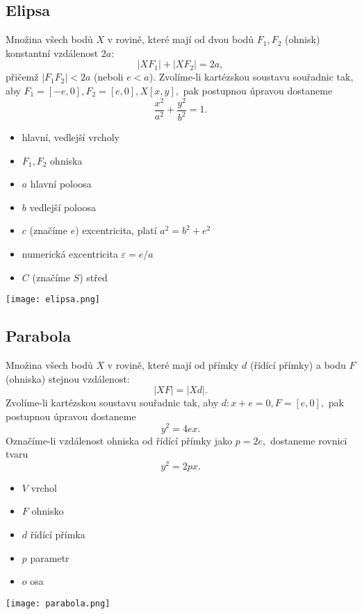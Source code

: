 \subsection{Elipsa}
Množina všech bodů $X$ v rovině, které mají od dvou bodů $F_1, F_2$
(ohnisk) konstantní vzdálenost $2a$:
$$|XF_1| + |XF_2|=2a,$$
přičemž $|F_1F_2|<2a$ (neboli $e<a$).
Zvolíme-li kartézskou soustavu souřadnic tak, aby $F_1 = [-e,0], F_2=[e,0],
X[x,y],$ pak postupnou úpravou dostaneme
$$\frac{x^2}{a^2}+\frac{y^2}{b^2}=1.$$

\begin{minipage}{0.48\linewidth}
\begin{itemize}
\item hlavní, vedlejší vrcholy
\item $F_1, F_2$ ohniska
\item $a$ hlavní poloosa
\item $b$ vedlejší poloosa
\item $c$ (značíme $e$) excentricita, platí $a^2=b^2+e^2$
\item numerická excentricita $\varepsilon = e/a$
\item $C$ (značíme $S$) střed
\end{itemize}
\end{minipage}
\hfill
\begin{minipage}{0.48\linewidth}
    \texttt{[image: elipsa.png]}
\end{minipage}


\subsection{Parabola}
Množina všech bodů $X$ v rovině, které mají od přímky $d$ (řídící přímky) a bodu $F$
(ohniska) stejnou vzdálenost:
$$|XF|=|Xd|.$$
Zvolíme-li kartézskou soustavu souřadnic tak, aby $d:x+e=0, F=[e,0],$ pak postupnou
úpravou dostaneme
$$y^2=4ex.$$
Označíme-li vzdálenost ohniska od řídící přímky jako $p=2e,$ dostaneme rovnici tvaru
$$y^2=2px.$$

\begin{minipage}{0.48\linewidth}
\begin{itemize}
\item $V$ vrchol
\item $F$ ohnisko
\item $d$ řídící přímka
\item $p$ parametr
\item $o$ osa
\end{itemize}
\end{minipage}
\hfill
\begin{minipage}{0.40\linewidth}
    \texttt{[image: parabola.png]}
\end{minipage}

